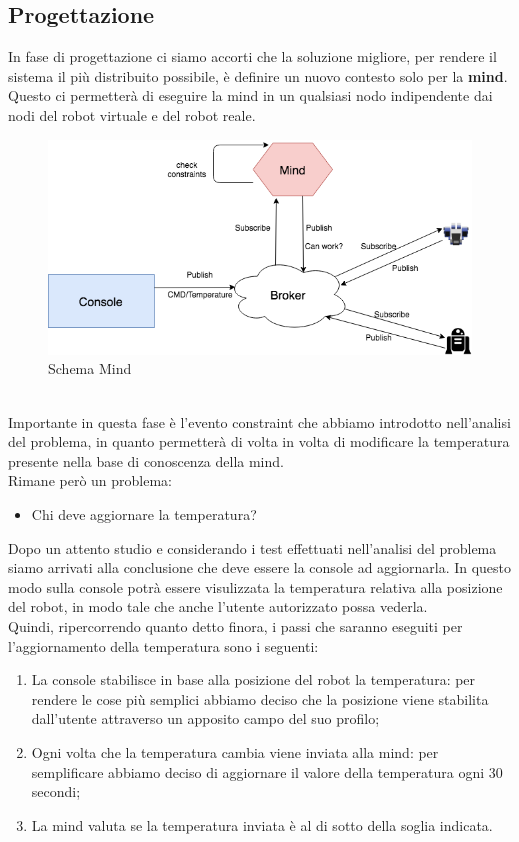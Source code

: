 \documentclass{llncs}
\begin{document}
\subsection{Progettazione}
\label{ProgettazioneReq2}
In fase di progettazione ci siamo accorti che la soluzione migliore, per rendere il sistema il pi\`u distribuito possibile, \`e definire un nuovo contesto solo per la \textbf{mind}. Questo ci permetter\`a di eseguire la mind in un qualsiasi nodo indipendente dai nodi del robot virtuale e del robot reale.\\
\begin{figure}
    \centering
    \includegraphics[width=1\textwidth]{Immagini/Requisito2/DiagrammaMind.png}
    \caption{Schema Mind}
    \label{PSchemaMind}
\end{figure}
\vspace*{1ex}
\\
Importante in questa fase \`e l'evento constraint che abbiamo introdotto nell'analisi del problema, in quanto permetter\`a di volta in volta di modificare la temperatura presente nella base di conoscenza della mind.\\
Rimane per\`o un problema:
\begin{itemize}
    \item Chi deve aggiornare la temperatura?
\end{itemize}
Dopo un attento studio e considerando i test effettuati nell'analisi del problema siamo arrivati alla conclusione che deve essere la console ad aggiornarla. In questo modo sulla console potr\`a essere visulizzata la temperatura relativa alla posizione del robot, in modo tale che anche l'utente autorizzato possa vederla.\\
Quindi, ripercorrendo quanto detto finora, i passi che saranno eseguiti per l'aggiornamento della temperatura sono i seguenti:
\begin{enumerate}
    \item La console stabilisce in base alla posizione del robot la temperatura: per rendere le cose pi\`u semplici abbiamo deciso che la posizione viene stabilita dall'utente attraverso un apposito campo del suo profilo;
    \item Ogni volta che la temperatura cambia viene inviata alla mind: per semplificare abbiamo deciso di aggiornare il valore della temperatura ogni 30 secondi;\label{secPuntoTemp}
    \item La mind valuta se la temperatura inviata \`e al di sotto della soglia indicata.
\end{enumerate}
\end{document}

